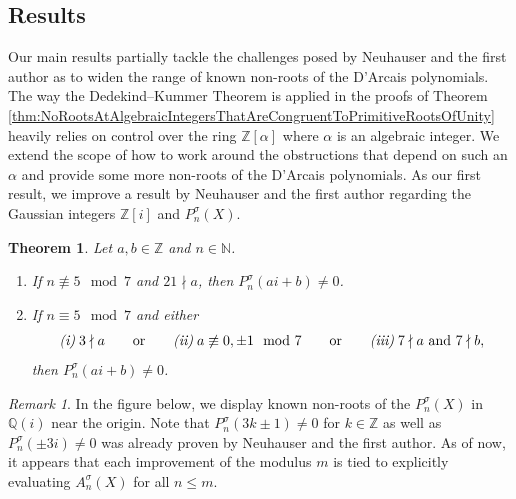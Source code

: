 \documentclass[a4paper, 11pt, reqno]{amsart}
\theoremstyle{plain}
\newtheorem{thm}{Theorem}[section]
\theoremstyle{definition}
\theoremstyle{remark}
\newtheorem*{rmk}{Remark}
\numberwithin{equation}{section}
\newcommand{\Z}{\mathbb{Z}}
\newcommand{\Q}{\mathbb{Q}}
\newcommand{\N}{\mathbb{N}}
\begin{document}
\subsection{Results} Our main results partially tackle the challenges posed by Neuhauser and the first author \cite{HeimNeu25} as to widen the range of known non-roots of the D'Arcais polynomials. The way the Dedekind--Kummer Theorem is applied in the proofs of Theorem \ref{thm:NoRootsAtAlgebraicIntegersThatAreCongruentToPrimitiveRootsOfUnity} heavily relies on control over the ring $\Z[\alpha]$ where $\alpha$ is an algebraic integer. We extend the scope of how to work around the obstructions that depend on such an $\alpha$ and provide some more non-roots of the D'Arcais polynomials. As our first result, we improve a result by Neuhauser and the first author regarding the Gaussian integers $\Z[i]$ and $P_n^\sigma(X)$.

\begin{thm}\label{thm:NonRootsOnImaginaryAxisWithSigma}
    Let $a, b \in \Z$ and $n \in \N$.
    \begin{enumerate}
        \item If $n \not \equiv 5 \mod 7$ and $21 \nmid a$, then $P_n^\sigma(ai + b) \neq 0$.
        \item If $n \equiv 5 \mod 7$ and either
        \begin{equation*}
            \textit{(i)} \; 3 \nmid a \qquad \textup{or} \qquad
            \textit{(ii)} \; a \not \equiv 0, \pm 1 \mod 7 \qquad \textup{or} \qquad
            \textit{(iii)} \; 7 \nmid a \textup{ and } 7 \nmid b,
        \end{equation*}
        then $P_n^\sigma(ai + b) \neq 0$.
    \end{enumerate}
\end{thm}

\begin{rmk}
    In the figure below, we display known non-roots of the $P_n^\sigma(X)$ in $\Q(i)$ near the origin. Note that $P_n^\sigma(3k \pm 1) \neq 0$ for $k \in \Z$ as well as $P_n^\sigma(\pm 3i) \neq 0$ was already proven by Neuhauser and the first author. As of now, it appears that each improvement of the modulus $m$ is tied to explicitly evaluating $A_n^\sigma(X)$ for all $n \leq m$.
\end{rmk}
\end{document}
